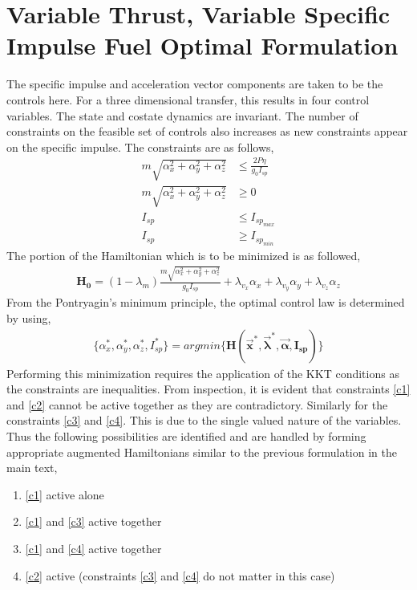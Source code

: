 
\chapter{Variable Thrust, Variable Specific Impulse Fuel Optimal Formulation}
\label{app3}
The specific impulse and acceleration vector components are taken to be the controls here. For a three dimensional transfer, this results in four control variables. The state and costate dynamics are invariant. The number of constraints on the feasible set of controls also increases as new constraints appear on the specific impulse. The constraints are as follows,
\begin{align}
	m\sqrt{\alpha_x^2+\alpha_y^2+\alpha_z^2}&\leq \frac{2P\eta}{g_0 I_{sp}}\label{c1}\\
	m\sqrt{\alpha_x^2+\alpha_y^2+\alpha_z^2}&\geq 0\label{c2}\\
	I_{sp}&\leq I_{sp_{max}}\label{c3}\\
	I_{sp}&\geq I_{sp_{min}}\label{c4}
\end{align}
The portion of the Hamiltonian which is to be minimized is as followed,
\begin{align}
	\boldsymbol{H_0}=(1-\lambda_m)\frac{m\sqrt{\alpha_x^2+\alpha_y^2+\alpha_z^2}}{g_0 I_{sp}}+\lambda_{v_x}\alpha_x+\lambda_{v_y}\alpha_y+\lambda_{v_z}\alpha_z
\end{align}
From the Pontryagin's minimum principle, the optimal control law is determined by using,
\begin{align}
	\{\alpha_x^*,\alpha_y^*,\alpha_z^*,I_{sp}^*\}=argmin\{\boldsymbol{H(\vec{x}^*,\vec{\lambda}^*,\vec{\alpha},I_{sp})}\}
\end{align}
Performing this minimization requires the application of the KKT conditions as the constraints are inequalities. From inspection, it is evident  that constraints \ref{c1} and \ref{c2} cannot be active together as they are contradictory. Similarly for the constraints \ref{c3} and \ref{c4}. This is due to the single valued nature of the variables. Thus the following possibilities are identified and are handled by forming appropriate augmented Hamiltonians similar to the previous formulation in the main text,
\begin{enumerate}[label=(\alph*)]
	\item \ref{c1} active alone
	\item \ref{c1} and \ref{c3} active together
	\item \ref{c1} and \ref{c4} active together
	\item \ref{c2} active (constraints \ref{c3} and \ref{c4} do not matter in this case)
\end{enumerate}
